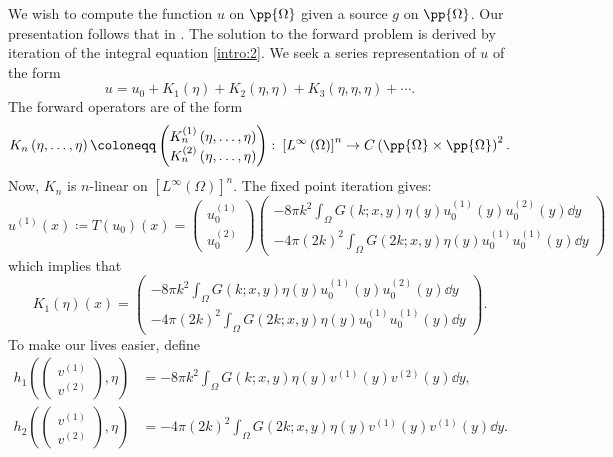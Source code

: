 \documentclass[a4paper, 12pt]{article}
\begin{document}
We wish to compute the function $u$ on $\pp{\Omega}$ given a source $g $ on $\pp{\Omega}$.
Our presentation follows that in \cite{DeFilippis_2023}.
The solution to the forward problem is derived by iteration of the integral equation \cref{intro:2}. We seek a series representation of $u$ of the form
\begin{equation}\label{born1}
u = u_0 + K_1\left( \eta \right) + K_2\left( \eta,\eta \right) +
K_3\left( \eta,\eta,\eta \right) +\cdots
.\end{equation}
The forward operators are of the form
\[
	K_{n}\left( \eta,\ldots,\eta \right)  \coloneqq \begin{pmatrix} K_n^{(1)}\left( \eta,\ldots,\eta \right) \\K_n^{(2)}\left( \eta,\ldots,\eta \right)  \end{pmatrix} \colon \left[ L^{\infty}\left( \Omega \right)  \right]^{n} \to C\left( \pp{\Omega}\times \pp{\Omega} \right)^2
.\]
Now, $K_{n}$ is $n$-linear on $\left[ L^{\infty}\left( \Omega \right) \right]^{n}$.
The fixed point iteration gives:
 \[
u^{(1)}\left( x \right)\coloneqq T\left( u_0 \right)\left( x \right)
= \begin{pmatrix} u_0^{(1)}\\u_0^{(2)} \end{pmatrix}
\begin{pmatrix}
	-8\pi k^2\int_{\Omega}^{} G\left(k; x,y \right) \eta\left( y \right) u_0^{(1)}\left( y \right) u^{(2)}_0\left( y \right)\dd{y}\\
	-4 \pi \left( 2k \right)^2\int_{\Omega}^{} G\left(2k; x,y \right) \eta\left( y \right)  u_0^{(1)}u_0^{(1)}\left( y \right)\dd{y}
\end{pmatrix}
\]
which implies that
\[
K_1\left( \eta \right) \left( x \right)
=\begin{pmatrix}
	-8\pi k^2\int_{\Omega}^{} G\left(k; x,y \right) \eta\left( y \right) u_0^{(1)}\left( y \right) u^{(2)}_0\left( y \right)\dd{y}\\
	-4 \pi\left( 2k \right)^2\int_{\Omega}^{} G\left(2k; x,y \right) \eta\left( y \right)  u_0^{(1)}u_0^{(1)}\left( y \right)\dd{y}
\end{pmatrix}
.\]
To make our lives easier, define
 \begin{align*}
	h_1\left( \begin{pmatrix} v^{(1)}\\v^{(2)} \end{pmatrix} , \eta \right)
	&= -8\pi k^2\int_{\Omega}^{} G\left(k; x,y \right) \eta\left( y \right) v^{(1)}\left( y \right) v^{(2)}\left( y \right)\dd{y},\\
	h_2\left( \begin{pmatrix} v^{(1)}\\v^{(2)} \end{pmatrix} , \eta \right)
	&= -4 \pi \left( 2k \right)^2\int_{\Omega}^{} G\left(2k; x,y \right) \eta\left( y \right) v^{(1)}\left( y \right) v^{(1)}\left( y \right)\dd{y}
.\end{align*}
\end{document}
